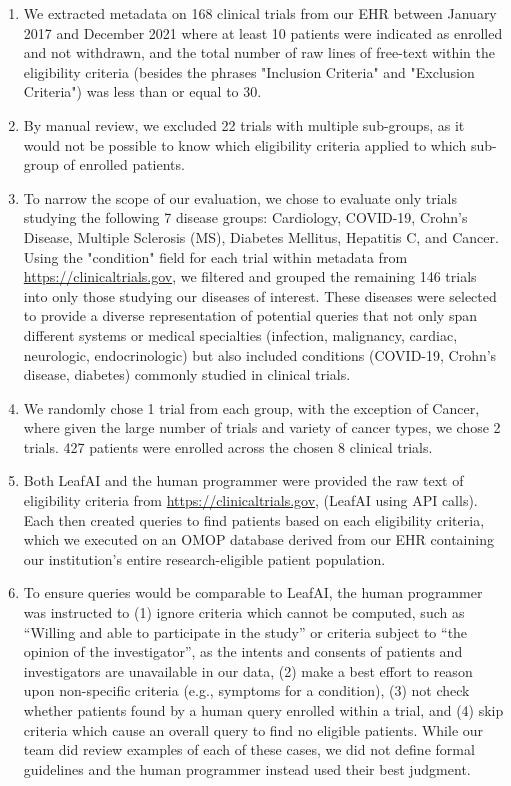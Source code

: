 \documentclass[../main.tex]{subfiles}
\begin{document}
\begin{enumerate}
    \item We extracted metadata on 168 clinical trials from our EHR between January 2017 and December 2021 where at least 10 patients were indicated as enrolled and not withdrawn, and the total number of raw lines of free-text within the eligibility criteria (besides the phrases "Inclusion Criteria" and "Exclusion Criteria") was less than or equal to 30.
    \item By manual review, we excluded 22 trials with multiple sub-groups, as it would not be possible to know which eligibility criteria applied to which sub-group of enrolled patients.
    \item To narrow the scope of our evaluation, we chose to evaluate only trials studying the following 7 disease groups: Cardiology, COVID-19, Crohn's Disease, Multiple Sclerosis (MS), Diabetes Mellitus, Hepatitis C, and Cancer. Using the "condition" field for each trial within metadata from \url{https://clinicaltrials.gov}, we filtered and grouped the remaining 146 trials into only those studying our diseases of interest. These diseases were selected to provide a diverse representation of potential queries that not only span different systems or medical specialties (infection, malignancy, cardiac, neurologic, endocrinologic) but also included conditions (COVID-19, Crohn’s disease, diabetes) commonly studied in clinical trials.
    \item We randomly chose 1 trial from each group, with the exception of Cancer, where given the large number of trials and variety of cancer types, we chose 2 trials. 427 patients were enrolled across the chosen 8 clinical trials.
    \item Both LeafAI and the human programmer were provided the raw text of eligibility criteria from \url{https://clinicaltrials.gov}, (LeafAI using API calls). Each then created queries to find patients based on each eligibility criteria, which we executed on an OMOP database derived from our EHR containing our institution’s entire research-eligible patient population.
    \item To ensure queries would be comparable to LeafAI, the human programmer was instructed to (1) ignore criteria which cannot be computed, such as “Willing and able to participate in the study” or criteria subject to “the opinion of the investigator”, as the intents and consents of patients and investigators are unavailable in our data, (2) make a best effort to reason upon non-specific criteria (e.g., symptoms for a condition), (3) not check whether patients found by a human query enrolled within a trial, and (4) skip criteria which cause an overall query to find no eligible patients. While our team did review examples of each of these cases, we did not define formal guidelines and the human programmer instead used their best judgment.
\end{enumerate}
\end{document}
